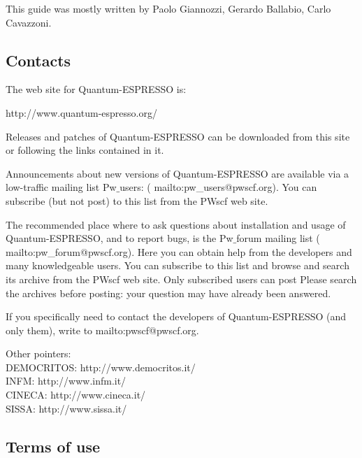 \documentclass[12pt,a4paper]{article}
\begin{document}
This guide was mostly written by Paolo Giannozzi, Gerardo Ballabio,
Carlo Cavazzoni.

\subsection{Contacts}

The web site for Quantum-ESPRESSO is:
\medskip

%
                  {http://www.quantum-espresso.org/}

\medskip
\noindent
Releases and patches of Quantum-ESPRESSO can be downloaded from this
site or following the links contained in it.

Announcements about new versions of Quantum-ESPRESSO are available
via a low-traffic mailing list Pw$\_$users:
(%
                   {mailto:pw\_users@pwscf.org}).
You can subscribe (but not post) to this list from the PWscf web site.

The recommended place where to ask questions about installation and
usage of Quantum-ESPRESSO, and to report bugs, is the Pw$\_$forum
mailing list
(%
                   {mailto:pw\_forum@pwscf.org}).
Here you can obtain help from the developers and many knowledgeable
users. You can subscribe to this list and browse and search its
archive from the PWscf web site.  Only subscribed users can post 
Please search the archives before posting: your 
question may have already been answered.

If you specifically need to contact the developers of Quantum-ESPRESSO
(and only them), write to
%
                  {mailto:pwscf@pwscf.org}.

Other pointers:\\
DEMOCRITOS:
%
                  {http://www.democritos.it/}\\
INFM:
%
                  {http://www.infm.it/}\\
CINECA:
%
                  {http://www.cineca.it/}\\
SISSA:
%
                  {http://www.sissa.it/}

\subsection{Terms of use}
\end{document}
